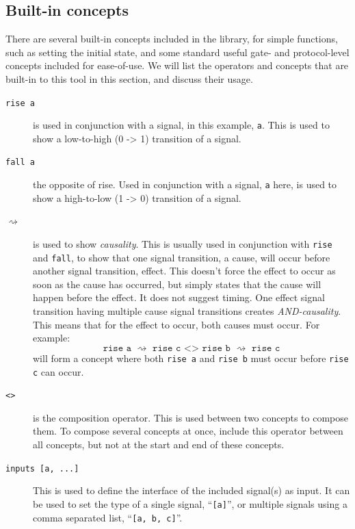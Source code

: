 \documentclass{proc}
\begin{document}
\subsection{Built-in concepts \label{sub:built-in_concepts}}

There are several built-in concepts included in the library, for simple functions, such as setting the initial state, and some standard useful gate- and protocol-level concepts included for 
ease-of-use. We will list the operators and concepts that are built-in to this tool in this section, and discuss their usage. 

\begin{description}
  \item [\texttt{rise a}] is used in conjunction with a signal, in this example, \texttt{a}. This is used to show a low-to-high (0 -> 1) transition of a signal.
  
  \item [\texttt{fall a}] the opposite of rise. Used in conjunction with a signal, \texttt{a} here,  is used to show a high-to-low (1 -> 0) transition of a signal.
  
  \item [$\rightsquigarrow$] is used to show \emph{causality}. This is usually used in conjunction with \texttt{rise} and \texttt{fall}, to show that one signal transition, a cause, will occur 
   before another signal transition, effect. This doesn't force the effect to occur as soon as the cause has occurred, but simply states that the cause will happen before the effect. It does 
   not suggest timing. One effect signal transition having multiple cause signal transitions creates \emph{AND-causality}. This means that for the effect to occur, both causes must occur. 
   For example: 
   \[
   \texttt{rise a $\rightsquigarrow$ rise c <> rise b $\rightsquigarrow$ rise c}
   \]
   will form a concept where both \texttt{rise a} and \texttt{rise b} must occur before \texttt{rise c} can occur.
   
   \item [\texttt{<>}] is the composition operator. This is used between two concepts to compose them. To compose several concepts at once, include this operator between all concepts, 
   but not at the start and end of these concepts. 
   
   \item [\texttt{inputs [a, ...]}] This is used to define the interface of the included signal(s) as input. It can be used to set the type of a single signal, ``\texttt{[a]}'', or multiple signals   
   using a comma separated list, ``\texttt{[a, b, c]}''.
   

\end{description}
\end{document}
